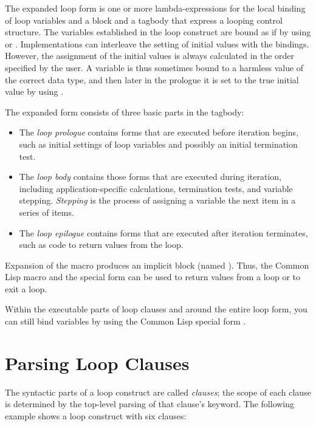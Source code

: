 The expanded loop form is
one or more lambda-expressions for the local binding of loop variables
and a block and a tagbody that express a looping control structure.   
  The variables established in the loop construct are bound as
  if by using  or .  Implementations can interleave the
  setting of initial values with the bindings.  However, the assignment
  of the initial values is always calculated in the order specified by
  the user.  A variable is thus sometimes bound to a harmless value of the
  correct data type, and then later in the prologue it is set to the true
  initial value by using .

The expanded form consists of three basic parts in the tagbody:

\begin{itemize}
\item
The {\it loop prologue\/} contains forms that are executed before iteration begins, 
such as initial settings of loop variables and possibly an initial
termination test.

\item
The {\it loop body\/}  contains those forms that are executed during iteration, 
including application-specific calculations, termination tests,
and variable stepping.  {\it Stepping\/} is the process of assigning a
variable the next item in a series of items.

\item
The {\it loop epilogue} contains forms that are executed after iteration 
terminates,
such as code to return values from the loop.
\end{itemize}


Expansion of the  macro produces an implicit block 
(named ).
Thus, the Common Lisp macro  and the special form 
 can be 
used to return values from a loop or to exit a loop.

  Within the executable parts of loop clauses and around the entire
  loop form, you can still bind variables by using the Common Lisp
  special form .



  \section{Parsing Loop Clauses}

  The syntactic parts of a loop construct are called {\it clauses}; the scope
  of each clause is determined by the top-level parsing of that clause's
  keyword.  The following example shows a loop construct with six
  clauses:

